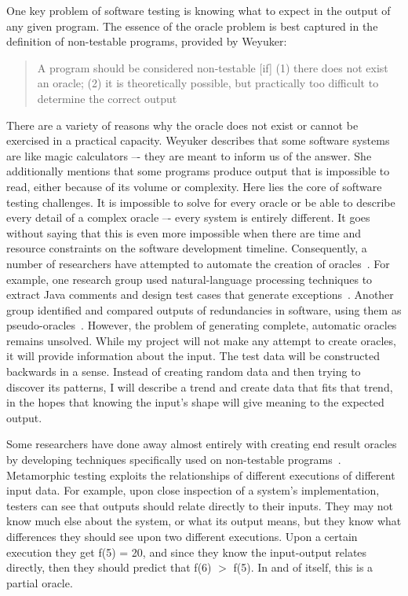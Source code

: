 One key problem of software testing is knowing what to expect in the output of any given program. The essence of the oracle problem is best captured in the definition of non-testable programs, provided by Weyuker:
\begin{quote}
A program should be considered non-testable [if] (1) there does not exist an oracle; (2) it is theoretically possible, but practically too difficult to determine the correct output~\cite{Chays:2000:FTD:347636.348954}
\end{quote}
There are a variety of reasons why the oracle does not exist or cannot be exercised in a practical capacity. Weyuker describes that some software systems are like magic calculators –- they are meant to inform us of the answer. She additionally mentions that some programs produce output that is impossible to read, either because of its volume or complexity. Here lies the core of software testing challenges. It is impossible to solve for every oracle or be able to describe every detail of a complex oracle –- every system is entirely different. It goes without saying that this is even more impossible when there are time and resource constraints on the software development timeline. Consequently, a number of researchers have attempted to automate the creation of oracles~\cite{6963470}. For example, one research group used natural-language processing techniques to extract Java comments and design test cases that generate exceptions~\cite{Goffi:2016:AGO:2931037.2931061}. Another group identified and compared outputs of redundancies in software, using them as pseudo-oracles~\cite{Carzaniga:2014:COI:2568225.2568287}. However, the problem of generating complete, automatic oracles remains unsolved. While my project will not make any attempt to create oracles, it will provide information about the input. The test data will be constructed backwards in a sense. Instead of creating random data and then trying to discover its patterns, I will describe a trend and create data that fits that trend, in the hopes that knowing the input's shape will give meaning to the expected output.

Some researchers have done away almost entirely with creating end result oracles by developing techniques specifically used on non-testable programs~\cite{Lindvall:2017:MMT:3103620.3103632,Segura:2017:TAD:3103620.3103626,Chen:2015:MTS:2819261.2819278,Chen:2016:SOC:2970276.2970366,Lindvall:2015:MMT:2819009.2819030}. Metamorphic testing exploits the relationships of different executions of different input data. For example, upon close inspection of a system's implementation, testers can see that outputs should relate directly to their inputs. They may not know much else about the system, or what its output means, but they know what differences they should see upon two different executions. Upon a certain execution they get f(5) = 20, and since they know the input-output relates directly, then they should predict that f(6) $>$ f(5). In and of itself, this is a partial oracle.

